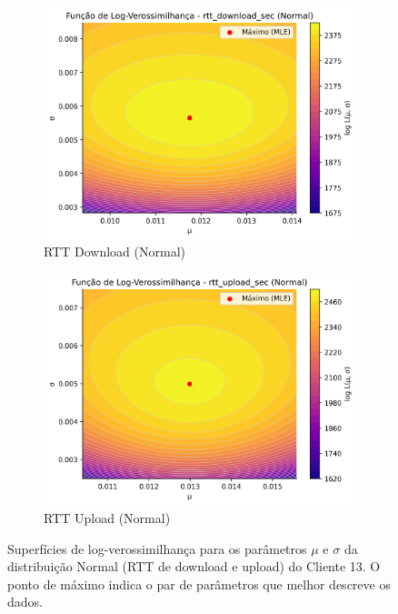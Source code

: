\documentclass{article}
\begin{document}
\begin{figure}[htp]
	\centering
	\begin{subfigure}[b]{0.48\textwidth} %
		\includegraphics[width=\textwidth]{../figures/mle/rtt_download_sec_loglik_surface_normal_client13.png}
		\caption{RTT Download (Normal)}
		\label{fig:rtt_download_sec_loglik_surface_normal_client13}
	\end{subfigure}
	\hfill %
	\begin{subfigure}[b]{0.48\textwidth} %
		\includegraphics[width=\textwidth]{../figures/mle/rtt_upload_sec_loglik_surface_normal_client13.png}
		\caption{RTT Upload (Normal)}
		\label{fig:rtt_upload_sec_loglik_surface_normal_client13}
	\end{subfigure}
	\caption{Superfícies de log-verossimilhança para os parâmetros $\mu$ e $\sigma$ da distribuição Normal (RTT de download e upload) do Cliente 13. O ponto de máximo indica o par de parâmetros que melhor descreve os dados.}
	\label{fig:rtt_loglik_normal_combined}
\end{figure}
\end{document}
